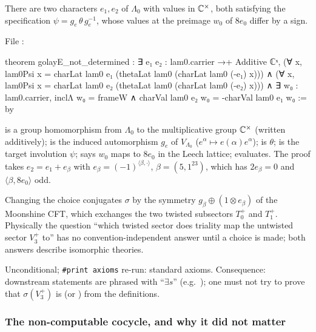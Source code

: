 \begin{theorem}\label{ch15:thm:golayE}
There are two characters $e_1,e_2$ of $\Lambda_0$ with values in ${\mathbb{C}}^\times$, both satisfying the
specification $\psi=g_e\,\theta\,g_e^{-1}$, whose values at the preimage $w_0$ of $8e_0$ differ by a
sign.
\end{theorem}
File :
\begin{leancode}
theorem golayE_not_determined :
    ∃ e₁ e₂ : lam0.carrier →+ Additive ℂˣ,
      (∀ x, lam0Psi x = charLat lam0 e₁ (thetaLat lam0 (charLat lam0 (-e₁) x))) ∧
      (∀ x, lam0Psi x = charLat lam0 e₂ (thetaLat lam0 (charLat lam0 (-e₂) x))) ∧
      ∃ w₀ : lam0.carrier, inclΛ w₀ = frameW ∧ charVal lam0 e₂ w₀ = -charVal lam0 e₁ w₀ := by
\end{leancode}
\begin{dictionary}
 is a group homomorphism from $\Lambda_0$ to the multiplicative
group ${\mathbb{C}}^\times$ (written additively);  is the induced automorphism $g_e$ of
$V_{\Lambda_0}$ ($e^\alpha\mapsto e(\alpha)e^\alpha$);  is $\theta$;  is
the target involution $\psi$;  says $w_0$ maps to $8e_0$ in the Leech
lattice;  evaluates. The proof takes $e_2=e_1+e_\beta$ with $e_\beta=(-1)^{\langle\beta,\cdot\rangle}$,
$\beta=(5,1^{23})$, which has $2e_\beta=0$ and $\langle\beta,8e_0\rangle$ odd.
\end{dictionary}
\begin{physics}
Changing the choice conjugates $\sigma$ by the symmetry $g_\beta\oplus(1\otimes e_\beta)$ of the
Moonshine CFT, which exchanges the two twisted subsectors $T_0^+$ and $T_1^+$. Physically the
question ``which twisted sector does triality map the untwisted sector $V_3^+$ to'' has no
convention-independent answer until a choice is made; both answers describe isomorphic theories.
\end{physics}
\begin{status}
Unconditional; \texttt{\#print axioms} re-run: standard axioms. Consequence: downstream statements
are phrased with ``$\exists s$'' (e.g.\ ); one must not try to prove that
$\sigma(V_3^+)$ is  (or ) from the definitions.
\end{status}

\subsubsection{The non-computable cocycle, and why it did not matter}

